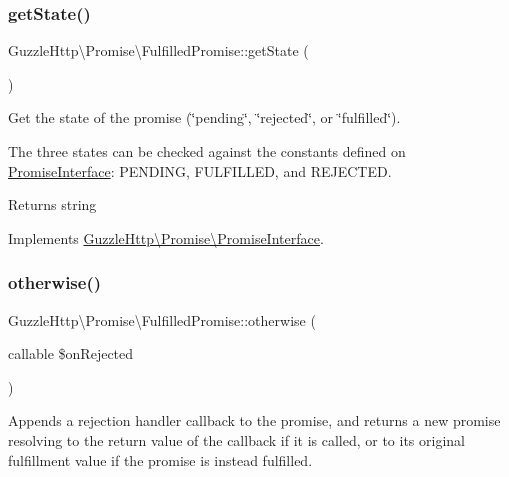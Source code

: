 \subsubsection{\texorpdfstring{get\+State()}{getState()}}
{\footnotesize\ttfamily Guzzle\+Http\textbackslash{}\+Promise\textbackslash{}\+Fulfilled\+Promise\+::get\+State (\begin{DoxyParamCaption}{ }\end{DoxyParamCaption})}

Get the state of the promise (\char`\"{}pending\char`\"{}, \char`\"{}rejected\char`\"{}, or \char`\"{}fulfilled\char`\"{}).

The three states can be checked against the constants defined on \hyperlink{interfaceGuzzleHttp_1_1Promise_1_1PromiseInterface}{Promise\+Interface}\+: P\+E\+N\+D\+I\+NG, F\+U\+L\+F\+I\+L\+L\+ED, and R\+E\+J\+E\+C\+T\+ED.

\begin{DoxyReturn}{Returns}
string 
\end{DoxyReturn}


Implements \hyperlink{interfaceGuzzleHttp_1_1Promise_1_1PromiseInterface_a4473485faedc0b6489ff28b4fbdc2330}{Guzzle\+Http\textbackslash{}\+Promise\textbackslash{}\+Promise\+Interface}.

\mbox{\label{classGuzzleHttp_1_1Promise_1_1FulfilledPromise_a15a81208044c38ea1d3128094431cf7f}} 
\subsubsection{\texorpdfstring{otherwise()}{otherwise()}}
{\footnotesize\ttfamily Guzzle\+Http\textbackslash{}\+Promise\textbackslash{}\+Fulfilled\+Promise\+::otherwise (\begin{DoxyParamCaption}\item[{callable}]{\$on\+Rejected }\end{DoxyParamCaption})}

Appends a rejection handler callback to the promise, and returns a new promise resolving to the return value of the callback if it is called, or to its original fulfillment value if the promise is instead fulfilled.


